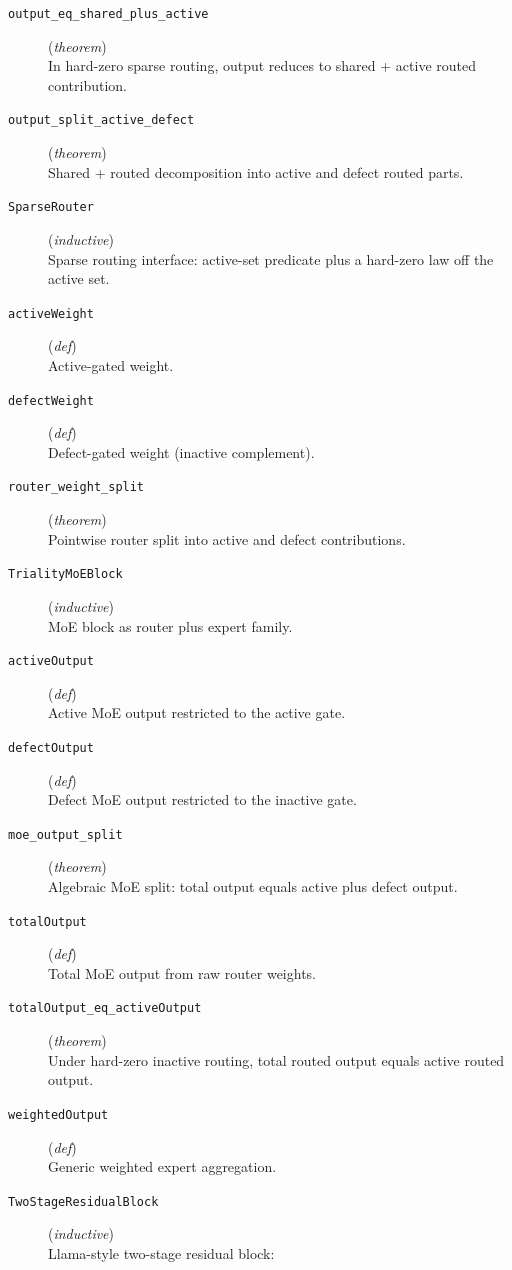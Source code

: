 \documentclass[11pt,a4paper]{article}
\begin{document}
\begin{description}
  \item[\texttt{output\_eq\_shared\_plus\_active}] (\textit{theorem}) \\ In hard-zero sparse routing, output reduces to shared + active routed contribution.
  \item[\texttt{output\_split\_active\_defect}] (\textit{theorem}) \\ Shared + routed decomposition into active and defect routed parts.
  \item[\texttt{SparseRouter}] (\textit{inductive}) \\ Sparse routing interface: active-set predicate plus a hard-zero law off the active set.
  \item[\texttt{activeWeight}] (\textit{def}) \\ Active-gated weight.
  \item[\texttt{defectWeight}] (\textit{def}) \\ Defect-gated weight (inactive complement).
  \item[\texttt{router\_weight\_split}] (\textit{theorem}) \\ Pointwise router split into active and defect contributions.
  \item[\texttt{TrialityMoEBlock}] (\textit{inductive}) \\ MoE block as router plus expert family.
  \item[\texttt{activeOutput}] (\textit{def}) \\ Active MoE output restricted to the active gate.
  \item[\texttt{defectOutput}] (\textit{def}) \\ Defect MoE output restricted to the inactive gate.
  \item[\texttt{moe\_output\_split}] (\textit{theorem}) \\ Algebraic MoE split: total output equals active plus defect output.
  \item[\texttt{totalOutput}] (\textit{def}) \\ Total MoE output from raw router weights.
  \item[\texttt{totalOutput\_eq\_activeOutput}] (\textit{theorem}) \\ Under hard-zero inactive routing, total routed output equals active routed output.
  \item[\texttt{weightedOutput}] (\textit{def}) \\ Generic weighted expert aggregation.
  \item[\texttt{TwoStageResidualBlock}] (\textit{inductive}) \\ Llama-style two-stage residual block: 

\end{description}
\end{document}
